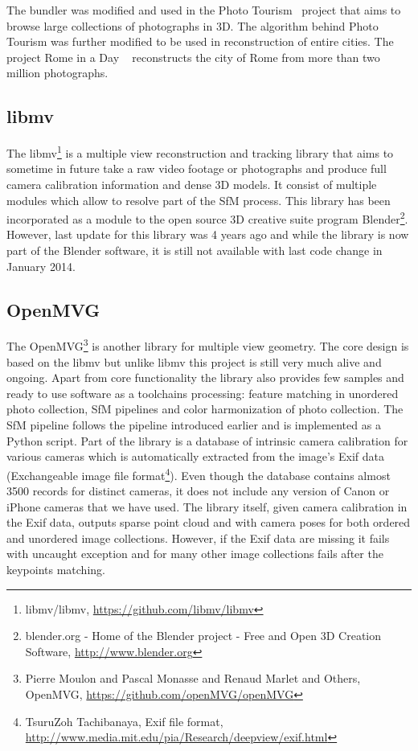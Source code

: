 The bundler was modified and used in the Photo Tourism~\cite{bundler, article:photo_tourism2} project that aims to browse large collections of photographs in 3D. The algorithm behind Photo Tourism was further modified to be used in reconstruction of entire cities. The project Rome in a Day ~\cite{article:rome_in_a_day, article:reconstructing_rome, article:rome_in_a_day2} reconstructs the city of Rome from more than two million photographs.

\subsection*{libmv}
The libmv\footnote{libmv/libmv, \url{https://github.com/libmv/libmv}} is a multiple view reconstruction and tracking library that aims to sometime in future take a raw video footage or photographs and produce full camera calibration information and dense 3D models. It consist of multiple modules which allow to resolve part of the SfM process. This library has been incorporated as a module to the open source 3D creative suite program Blender\footnote{blender.org - Home of the Blender project - Free and Open 3D Creation Software, \url{http://www.blender.org}}. However, last update for this library was 4 years ago and while the library is now part of the Blender software, it is still not available with last code change in January 2014.

\subsection*{OpenMVG}
The OpenMVG\footnote{Pierre Moulon and Pascal Monasse and Renaud Marlet and Others, OpenMVG, \url{https://github.com/openMVG/openMVG}} is another library for multiple view geometry. The core design is based on the libmv but unlike libmv this project is still very much alive and ongoing. Apart from core functionality the library also provides few samples and ready to use software as a toolchains processing: feature matching in unordered photo collection, SfM pipelines and color harmonization of photo collection. The SfM pipeline follows the pipeline introduced earlier and is implemented as a Python script. Part of the library is a database of intrinsic camera calibration for various cameras which is automatically extracted from the image's Exif data (Exchangeable image file format\footnote{TsuruZoh Tachibanaya, Exif file format, \url{http://www.media.mit.edu/pia/Research/deepview/exif.html}}). Even though the database contains almost 3500 records for distinct cameras, it does not include any version of Canon  or iPhone cameras that we have used. The library itself, given camera calibration in the Exif data, outputs sparse point cloud and with camera poses for both ordered and unordered image collections. However, if the Exif data are missing it fails with uncaught exception and for many other image collections fails after the keypoints matching.

